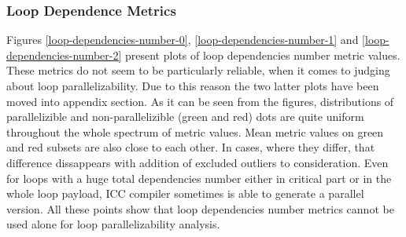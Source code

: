 \subsubsection{Loop Dependence Metrics}
\label{analysis-loop-dependence-metrics}
\qquad Figures \ref{loop-dependencies-number-0}, \ref{loop-dependencies-number-1} and \ref{loop-dependencies-number-2} present plots of loop dependencies number metric values. These metrics do not seem to be particularly reliable, when it comes to judging about loop parallelizability. Due to this reason the two latter plots have been moved into appendix section.\newline
\null\qquad As it can be seen from the figures, distributions of parallelizible and non-parallelizible (green and red) dots are quite uniform throughout the whole spectrum of metric values. Mean metric values on green and red subsets are also close to each other. In cases, where they differ, that difference dissappears with addition of excluded outliers to consideration. Even for loops with a huge total dependencies number either in critical part or in the whole loop payload, ICC compiler sometimes is able to generate a parallel version. All these points show that loop dependencies number metrics cannot be used alone for loop parallelizability analysis.

